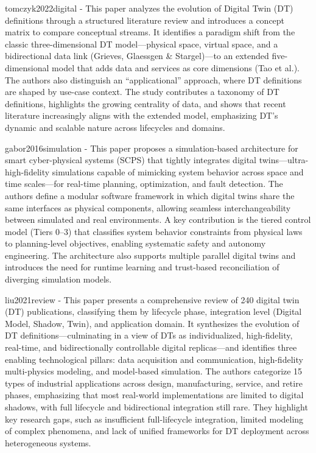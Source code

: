 tomczyk2022digital - This paper analyzes the evolution of Digital Twin (DT) definitions through a structured literature review and introduces a concept matrix to compare conceptual streams. It identifies a paradigm shift from the classic three-dimensional DT model—physical space, virtual space, and a bidirectional data link (Grieves, Glaessgen \& Stargel)—to an extended five-dimensional model that adds data and services as core dimensions (Tao et al.). The authors also distinguish an “applicational” approach, where DT definitions are shaped by use-case context. The study contributes a taxonomy of DT definitions, highlights the growing centrality of data, and shows that recent literature increasingly aligns with the extended model, emphasizing DT’s dynamic and scalable nature across lifecycles and domains.

gabor2016simulation - This paper proposes a simulation-based architecture for smart cyber-physical systems (SCPS) that tightly integrates digital twins—ultra-high-fidelity simulations capable of mimicking system behavior across space and time scales—for real-time planning, optimization, and fault detection. The authors define a modular software framework in which digital twins share the same interfaces as physical components, allowing seamless interchangeability between simulated and real environments. A key contribution is the tiered control model (Tiers 0–3) that classifies system behavior constraints from physical laws to planning-level objectives, enabling systematic safety and autonomy engineering. The architecture also supports multiple parallel digital twins and introduces the need for runtime learning and trust-based reconciliation of diverging simulation models.


liu2021review - This paper presents a comprehensive review of 240 digital twin (DT) publications, classifying them by lifecycle phase, integration level (Digital Model, Shadow, Twin), and application domain. It synthesizes the evolution of DT definitions—culminating in a view of DTs as individualized, high-fidelity, real-time, and bidirectionally controllable digital replicas—and identifies three enabling technological pillars: data acquisition and communication, high-fidelity multi-physics modeling, and model-based simulation. The authors categorize 15 types of industrial applications across design, manufacturing, service, and retire phases, emphasizing that most real-world implementations are limited to digital shadows, with full lifecycle and bidirectional integration still rare. They highlight key research gaps, such as insufficient full-lifecycle integration, limited modeling of complex phenomena, and lack of unified frameworks for DT deployment across heterogeneous systems.


